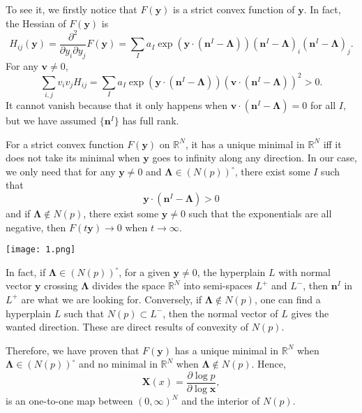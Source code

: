 \documentclass[12pt]{article}
\theoremstyle{definition}
\theoremstyle{plain}
\begin{document}
To see it, we firstly notice that $F(\mathbf y)$ is a strict convex function of $\mathbf y$. In fact, the Hessian of $F(\mathbf y)$ is 
\[
	H_{ij}(\mathbf y)=\frac{\partial^2}{\partial y_i\partial y_j}F(\mathbf y)=\sum_I a_I \exp\left(\mathbf{y}\cdot \left(\mathbf{n}^I-\mathbf{\Lambda}\right)\right)\left(\mathbf{n}^I-\mathbf{\Lambda}\right)_i\left(\mathbf{n}^I-\mathbf{\Lambda}\right)_j.
\]
For any $\mathbf v\neq 0$, 
\[
	\sum_{i,j}v_iv_jH_{ij}=\sum_I a_I \exp\left(\mathbf{y}\cdot \left(\mathbf{n}^I-\mathbf{\Lambda}\right)\right) \left(\mathbf v\cdot (\mathbf{n}^I-\mathbf{\Lambda})\right)^2 >0.
\]
It cannot vanish because that it only happens when $\mathbf v\cdot (\mathbf{n}^I-\mathbf{\Lambda})=0$ for all $I$, but we have assumed $\{\mathbf n^I\}$ has full rank.

For a strict convex function $F(\mathbf y)$ on $\mathbb R^N$, it has a unique minimal in $\mathbb R^N$ iff it does not take its minimal when $\mathbf{y}$ goes to infinity along any direction. In our case, we only need that for any $\mathbf{y}\neq 0$ and $\mathbf\Lambda \in (N(p))^\circ $, there exist some $I$ such that  
\[
	\mathbf{y}\cdot (\mathbf{n}^I-\mathbf{\Lambda})>0
\]
and if $\mathbf\Lambda \not\in N(p)$, there exist some $\mathbf{y}\neq 0$ such that the exponentials are all negative, then $F(t\mathbf y)\to 0$ when $t\to \infty$.

\begin{center}
	\texttt{[image: 1.png]}
\end{center}

In fact, if $\mathbf\Lambda \in (N(p))^\circ$, for a given $\mathbf y\neq 0$, the hyperplain $L$ with normal vector $\mathbf y$ crossing $\mathbf \Lambda$ divides the space $\mathbb R^N$ into semi-spaces $L^+$ and $L^-$, then $\mathbf{n}^I$ in $L^+$ are what we are looking for. Conversely, if $\mathbf\Lambda \not\in N(p)$, one can find a hyperplain $L$ such that $N(p)\subset L^-$, then the normal vector of $L$ gives the wanted direction. These are direct results of convexity of $N(p)$.

Therefore, we have proven that $F(\mathbf y)$ has a unique minimal in $\mathbb R^N$ when $\mathbf \Lambda \in (N(p))^\circ$ and no minimal in $\mathbb R^N$ when $\mathbf \Lambda \not\in N(p)$. Hence, 
\[
	\mathbf X(x)=\frac{\partial \log p}{\partial \log \mathbf x},
\]
is an one-to-one map between $(0,\infty)^N$ and the interior of $N(p)$.
\end{document}
